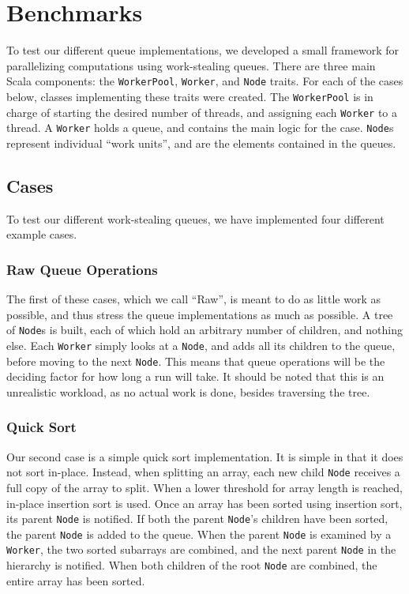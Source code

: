 \section{Benchmarks}
To test our different queue implementations, we developed a small framework
for parallelizing computations using work-stealing queues. There are three
main Scala components: the \texttt{WorkerPool}, \texttt{Worker}, and \texttt{Node}
traits. For each of the cases below, classes implementing these traits were
created. The \texttt{WorkerPool} is in charge of starting the desired number
of threads, and assigning each \texttt{Worker} to a thread. A \texttt{Worker}
holds a queue, and contains the main logic for the case. \texttt{Node}s
represent individual ``work units'', and are the elements contained in the
queues.

\label{sec:benchmarks}
\subsection{Cases}
To test our different work-stealing queues, we have implemented four different
example cases.
\subsubsection{Raw Queue Operations} %

The first of these cases, which we call ``Raw'', is meant to do as little work as possible,
and thus stress the queue implementations as much as possible. A tree of \texttt{Node}s is built, each of which hold an
arbitrary number of children, and nothing else. Each \texttt{Worker} simply
looks at a \texttt{Node}, and adds all its children to the queue, before
moving to the next \texttt{Node}. This means that queue operations will be the
deciding factor for how long a run will take. It should be noted that this is
an unrealistic workload, as no actual work is done, besides traversing the
tree.

\subsubsection{Quick Sort} %
Our second case is a simple quick sort implementation. It is simple in that it
does not sort in-place. Instead, when splitting an array, each new child
\texttt{Node} receives a full copy of the array to split. When a lower
threshold for array length is reached, in-place insertion sort is used. Once an array
has been sorted using insertion sort, its parent \texttt{Node} is notified. If
both the parent \texttt{Node}'s children have been sorted, the parent
\texttt{Node} is added to the queue. When the parent \texttt{Node} is examined
by a \texttt{Worker}, the two sorted subarrays are combined, and the next
parent \texttt{Node} in the hierarchy is notified. When both children of the
root \texttt{Node} are combined, the entire array has been sorted. 

